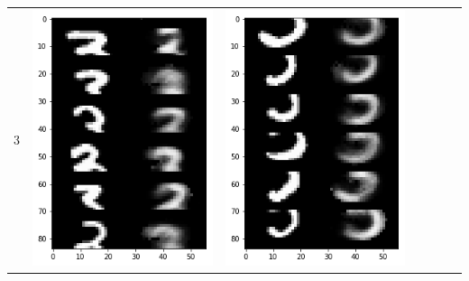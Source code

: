 \documentclass[12pt]{report} %
\begin{document}
\begin{tabular}{m{0.7cm}m{2.4cm}m{2.4cm}m{2.4cm}m{2.4cm}m{2.4cm}m{2.4cm}}
3 & \includegraphics[scale=0.3]{pictures/KE_3_up.png} & \includegraphics[scale=0.3]{pictures/KE_3_down.png} &

\end{tabular}
\end{document}
